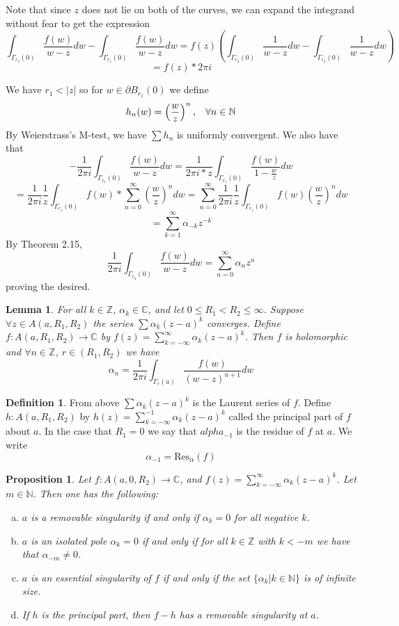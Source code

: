 \documentclass[11pt]{article}
\theoremstyle{plain}
\newtheorem{lemma}[theorem]{Lemma}
\newtheorem{proposition}[theorem]{Proposition}
\theoremstyle{definition}
\newtheorem{definition}[theorem]{Definition}
\newcommand{\C}{\mathbb{C}}
\newcommand{\Z}{\mathbb{Z}}
\begin{document}
Note that since $z$ does not lie on both of the curves, we can expand the integrand without fear to get the expression
$$ \int_{\Gamma_{r_2}(0)} \frac{f(w)}{w-z} dw - \int_{\Gamma_{r_1}(0)} \frac{f(w)}{w - z} dw = f(z) \left( \int_{\Gamma_{r_2}(0)} \frac{1}{w-z} dw - \int_{\Gamma_{r_2}(0)} \frac{1}{w-z}dw \right) $$
$$ = f(z) * 2\pi i $$

We have $r_1 < |z|$ so for $w \in \partial B_{r_1}(0)$ we define 
$$ h_n(w) = \left(\frac{w}{z}\right)^n, \hspace{3mm} \forall n \in \mathbb{N} $$ 
By Weierstrass's M-test, we have $\sum h_n$ is uniformly convergent. We also have that 
$$ -\frac{1}{2\pi i} \int_{\Gamma_{r_1}(0)} \frac{f(w)}{w-z}dw = \frac{1}{2\pi i * z} \int_{\Gamma_{r_1}(0)} \frac{f(w)}{1 - \frac{w}{z}} dw $$
$$ = \frac{1}{2\pi i} \frac{1}{z} \int_{\Gamma_{r_1}(0)} f(w) * \sum_{n=0}^{\infty} \left(\frac{w}{z}\right)^n dw  = \sum_{n=0}^\infty \frac{1}{2\pi i} \frac{1}{z} \int_{\Gamma_{r_1}(0)} f(w) \left(\frac{w}{z}\right)^n dw $$
$$ = \sum_{k=1}^\infty \alpha_{-k} z^{-k} $$
By Theorem 2.15, 
$$ \frac{1}{2\pi i} \int_{\Gamma_{r_2}(0)} \frac{f(w)}{w-z} dw = \sum_{n=0}^\infty \alpha_n z^n $$
proving the desired.

\begin{lemma}
For all $k \in \Z$, $\alpha_k \in \C$, and let $0 \leq R_1 < R_2 \leq \infty$. Suppose $\forall z \in A(a, R_1, R_2)$ the series $\sum \alpha_k (z - a)^k$ converges. Define $f: A(a, R_1, R_2) \to \C$ by $f(z) = \sum_{k=-\infty}^\infty \alpha_k(z-a)^k$. Then $f$ is holomorphic and $\forall n \in \Z$, $r \in (R_1, R_2)$ we have 
$$ \alpha_n = \frac{1}{2\pi i} \int_{\Gamma_r(a)} \frac{f(w)}{(w-z)^{n+1}} dw $$
\end{lemma}

\begin{definition}
From above $\sum \alpha_k (z-a)^k$ is the Laurent series of $f$. Define $h: A(a, R_1, R_2)$ by $h(z) = \sum_{k=-\infty}^{-1} \alpha_k (z - a)^k$ called the principal part of $f$ about $a$. In the case that $R_1 = 0$ we say that $alpha_{-1}$ is the residue of $f$ at $a$.
We write 
$$ \alpha_{-1} = \text{Res}_\alpha(f) $$
\end{definition}

\begin{proposition}
Let $f:A(a, 0, R_2) \to \C$, and $f(z) = \sum_{k=-\infty}^\infty \alpha_k(z-a)^k$. Let $m \in \mathbb{N}$. Then one has the following:
\begin{enumerate}[(a)]
\item $a$ is a removable singularity if and only if $\alpha_k = 0$ for all negative $k$.
\item $a$ is an isolated pole $\alpha_k = 0$ if and only if for all $k \in \Z$ with $k < -m$ we have that $\alpha_{-m} \neq 0$.
\item $a$ is an essential singularity of $f$ if and only if the set $\{ \alpha_k | k \in \mathbb{N} \}$ is of infinite size. 
\item If $h$ is the principal part, then $f - h$ has a removable singularity at $a$.
\end{enumerate}
\end{proposition}
\end{document}
